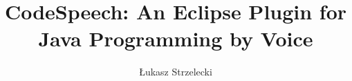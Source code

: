 \documentclass[master,english]{hgbthesis}
\title{CodeSpeech: An Eclipse Plugin for \\Java Programming by Voice }
\author{Łukasz Strzelecki}
\begin{document}

\frontmatter							%

\maketitle
\tableofcontents


%

\mainmatter          			%









\appendix                                         %


\MakeBibliography                        				%



\end{document}
